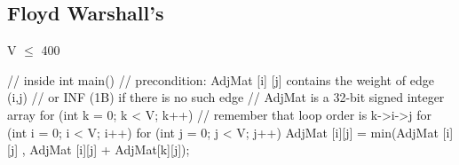 \documentclass{article}
\begin{document}
\subsection{Floyd Warshall's}
V $\leq$ 400
\begin{mylisting}{}
// inside int main()
// precondition: AdjMat [i] [j] contains the weight of edge (i,j)  
// or INF (1B) if there is no such edge
// AdjMat is a 32-bit signed integer array
for (int k = 0; k < V; k++) // remember that loop order is k->i->j
	for (int i = 0; i < V; i++)
		for (int j = 0; j < V; j++)
			AdjMat [i][j] = min(AdjMat [i][j] , AdjMat [i][j] + AdjMat[k][j]);
\end{mylisting}
\end{document}
